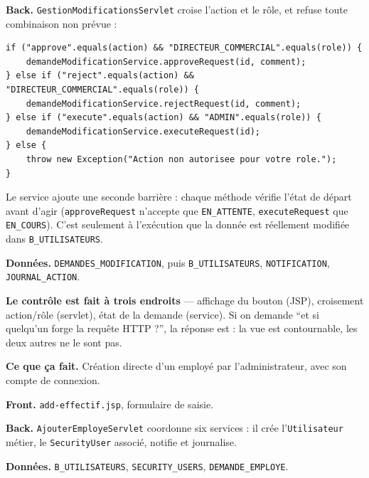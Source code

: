 \textbf{Back.} \texttt{GestionModificationsServlet} croise l'action et le rôle,
et refuse toute combinaison non prévue :

\begin{lstlisting}[style=java]
if ("approve".equals(action) && "DIRECTEUR_COMMERCIAL".equals(role)) {
    demandeModificationService.approveRequest(id, comment);
} else if ("reject".equals(action) && "DIRECTEUR_COMMERCIAL".equals(role)) {
    demandeModificationService.rejectRequest(id, comment);
} else if ("execute".equals(action) && "ADMIN".equals(role)) {
    demandeModificationService.executeRequest(id);
} else {
    throw new Exception("Action non autorisee pour votre role.");
}
\end{lstlisting}

Le service ajoute une seconde barrière : chaque méthode vérifie l'état de
départ avant d'agir (\texttt{approveRequest} n'accepte que \texttt{EN\_ATTENTE},
\texttt{executeRequest} que \texttt{EN\_COURS}). C'est seulement à l'exécution
que la donnée est réellement modifiée dans \texttt{B\_UTILISATEURS}.

\textbf{Données.} \texttt{DEMANDES\_MODIFICATION}, puis
\texttt{B\_UTILISATEURS}, \texttt{NOTIFICATION}, \texttt{JOURNAL\_ACTION}.

\begin{retenir}
\textbf{Le contrôle est fait à trois endroits} --- affichage du bouton (JSP),
croisement action/rôle (servlet), état de la demande (service). Si on demande
\enquote{et si quelqu'un forge la requête HTTP ?}, la réponse est : la vue est
contournable, les deux autres ne le sont pas.
\end{retenir}


\textbf{Ce que ça fait.} Création directe d'un employé par l'administrateur,
avec son compte de connexion.

\textbf{Front.} \texttt{add-effectif.jsp}, formulaire de saisie.

\textbf{Back.} \texttt{AjouterEmployeServlet} coordonne six services : il crée
l'\texttt{Utilisateur} métier, le \texttt{SecurityUser} associé, notifie et
journalise.

\textbf{Données.} \texttt{B\_UTILISATEURS}, \texttt{SECURITY\_USERS},
\texttt{DEMANDE\_EMPLOYE}.
